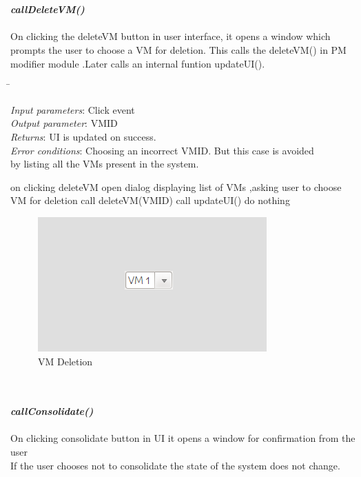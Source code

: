 \documentclass{article}
\begin{document}
\mbox{}\\\\
 \emph{\bf callDeleteVM()}\\\\
 On clicking the deleteVM button in user interface, it opens a window  which prompts the user to choose a VM for deletion.
 This calls the deleteVM() in PM modifier module .Later calls an internal funtion updateUI().
 \\  \begin{tabbing}
   \hspace*{4cm}\= \kill
 
 \emph{Input parameters}\>: Click event\\
 \emph{Output parameter}\>: VM\textunderscore ID\\
\emph{Returns}\>: UI is updated on success.\\
\emph{Error conditions}\>: Choosing an incorrect VM\textunderscore ID. But this case is avoided \\ \> by listing all the VMs present in the system.
\end{tabbing}
\begin{algorithmic}[1]
 \STATE on clicking deleteVM
 \STATE open dialog displaying list of VMs ,asking user to choose VM for deletion
 \STATE call deleteVM(VM\textunderscore ID)
 \STATE call updateUI()
 \ELSE
 \STATE do nothing
 \ENDIF
 \end{algorithmic}
\begin{figure}[ht!]
\centering
\includegraphics[scale=0.8, angle=0]{4.png}
\caption{VM Deletion}
\end{figure}
\mbox{}\\\\
\emph{\bf callConsolidate()}\\\\
On clicking consolidate button in UI it opens a window for confirmation from the user \\
If the user chooses not to consolidate the state of the system does not change.\\
\end{document}
